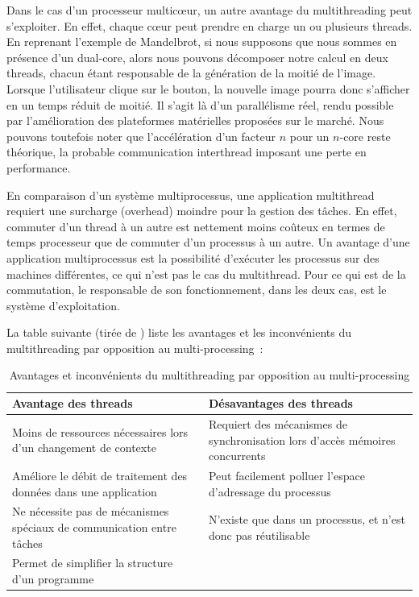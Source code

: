 Dans le cas d'un processeur multicœur, un autre avantage du multithreading peut s'exploiter. En effet, chaque cœur peut prendre en charge un ou plusieurs threads. En reprenant l'exemple de Mandelbrot, si nous supposons que nous sommes en présence d'un dual-core, alors nous pouvons décomposer notre calcul en deux threads, chacun étant responsable de la génération de la moitié de l'image. Lorsque l'utilisateur clique sur le bouton, la nouvelle image pourra donc s'afficher en un temps réduit de moitié. Il s'agit là d'un parallélisme réel, rendu possible par l'amélioration des plateformes matérielles proposées sur le marché. Nous pouvons toutefois noter que l'accélération d'un facteur $n$ pour un $n$-core reste théorique, la probable communication interthread imposant une perte en performance.

En comparaison d'un système multiprocessus, une application multithread requiert une surcharge (overhead) moindre pour la gestion des tâches. En effet, commuter d'un thread à un autre est nettement moins coûteux en termes de temps processeur que de commuter d'un processus à un autre. Un avantage d'une application multiprocessus est la possibilité d'exécuter les processus sur des machines différentes, ce qui n'est pas le cas du multithread. Pour ce qui est de la commutation, le responsable de son fonctionnement, dans les deux cas, est le système d'exploitation.

La table suivante (tirée de \cite{hughes03parallel}) liste les avantages et les inconvénients du multithreading par opposition au multi-processing~:

\begin{table}[ht]
  \begin{center}
    \caption{\label{tab:thread-vs-process}Avantages et inconvénients du multithreading par opposition au multi-processing}
    \begin{tabular}{p{}p{}}
      \toprule
      \textbf{Avantage des threads}                                         & \textbf{Désavantages des threads}                                            \\
      \midrule
      Moins de ressources nécessaires lors d'un changement de contexte      & Requiert des mécanismes de synchronisation lors d'accès mémoires concurrents \\
      Améliore le débit de traitement des données dans une application      & Peut facilement polluer l'espace d'adressage du processus                    \\
      Ne nécessite pas de mécanismes spéciaux de communication entre tâches & N'existe que dans un processus, et n'est donc pas réutilisable               \\
      Permet de simplifier la structure d'un programme                      &                                                                              \\
      \bottomrule
    \end{tabular}
  \end{center}
\end{table}

